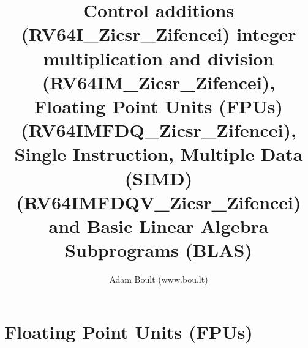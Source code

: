 \documentclass[oneside]{book}
\begin{document}
\author{Adam Boult (www.bou.lt)}
\title{Control additions (RV64I\_Zicsr\_Zifencei) integer multiplication and division (RV64IM\_Zicsr\_Zifencei), Floating Point Units (FPUs) (RV64IMFDQ\_Zicsr\_Zifencei), Single Instruction, Multiple Data (SIMD) (RV64IMFDQV\_Zicsr\_Zifencei) and Basic Linear Algebra Subprograms (BLAS)}
\maketitle

\setcounter{tocdepth}{0}
\tableofcontents



\part{Floating Point Units (FPUs)}
\end{document}

